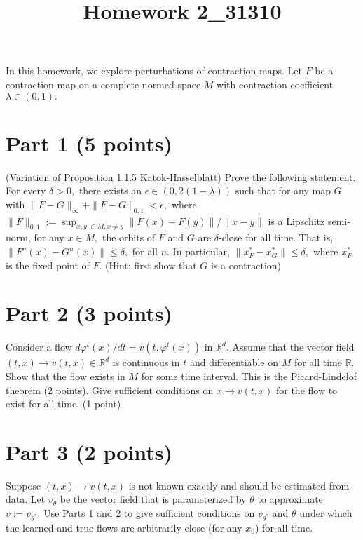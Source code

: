\documentclass[12pt]{article}
\title{Homework 2_31310}
\begin{document}
\MakeScribeTop

In this homework, we explore perturbations of contraction maps.
Let $F$ be a contraction map on a complete normed space $M$ with contraction coefficient 
$\lambda \in (0,1).$

\section*{Part 1 (5 points)}
(Variation of Proposition 1.1.5 Katok-Hasselblatt) 
Prove the following statement. For every $\delta > 0,$ there exists an $\epsilon \in (0, 2(1-\lambda))$ such that for any map $G$ with $\|F - G\|_\infty + \|F - G\|_{0,1} < \epsilon,$ where 
$\|F\|_{0,1} := \sup_{x, y \; \in M, x \neq y} \|F(x) - F(y)\|/\|x - y\|$ is a Lipschitz semi-norm, for any $x \in M,$ the orbits of $F$ and $G$ are $\delta$-close for all time.
That is, $\|F^n(x) - G^n(x)\| \leq \delta,$ for all $n.$ In particular, 
$\|x^*_F - x^*_G \|\leq \delta,$ where $x^*_F$ is the fixed point of $F.$ 
(Hint: first show that $G$ is a contraction)


\section*{Part 2 (3 points)}
Consider a flow $d\varphi^t(x)/dt = v(t, \varphi^t(x))$ in $\mathbb{R}^d.$ Assume that the vector field $(t, x) \to v(t,x) \in \mathbb{R}^d$ is continuous in $t$ and differentiable
 on $M$ for all time $\mathbb{R}.$ Show that the flow exists in $M$ for some time interval. This is the Picard-Lindel\"of theorem (2 points). Give sufficient conditions on $x \to v(t, x)$ for the flow to exist for all time. (1 point)

\section*{Part 3 (2 points)}
Suppose $(t, x) \to v(t, x)$ is not known exactly and should be estimated from data. Let $v_\theta$ be the vector field that is parameterized by $\theta$ to 
approximate $v := v_{\theta^*}.$ Use Parts 1 and 2 to give sufficient conditions on $v_{\theta^*}$ and $\theta$ under which the learned and true flows are arbitrarily close (for any $x_0$) for all time. 
\end{document}
